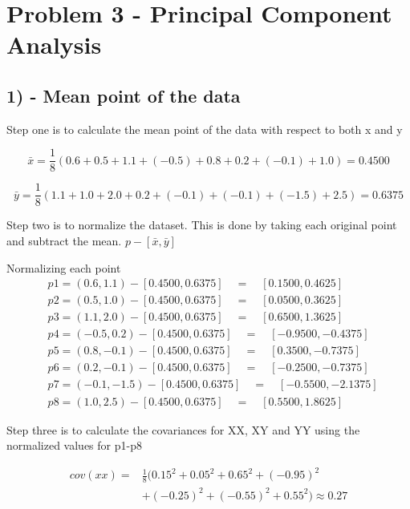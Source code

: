 \section{Problem 3 - Principal Component Analysis}
\subsection{1) - Mean point of the data}
Step one is to calculate the mean point of the data with respect to both x and y

$$\bar{x} = \frac{1}{8} (0.6 + 0.5 + 1.1 + (-0.5) + 0.8 + 0.2 + (-0.1) + 1.0) = 0.4500$$

$$\bar{y} = \frac{1}{8} (1.1 + 1.0 + 2.0 + 0.2 + (-0.1) + (-0.1) + (-1.5) + 2.5) = 0.6375$$

Step two is to normalize the dataset. This is done by taking each original point
and subtract the mean.
$p - [\bar{x}, \bar{y}]$

Normalizing each point
\begin{align}
    &p1 = (0.6 , 1.1) - [0.4500, 0.6375] \quad = \quad [0.1500, 0.4625] \\
    &p2 = (0.5 , 1.0) - [0.4500, 0.6375] \quad = \quad [0.0500, 0.3625] \\
    &p3 = (1.1 , 2.0) - [0.4500, 0.6375] \quad = \quad [0.6500, 1.3625] \\
    &p4 = (-0.5 , 0.2) - [0.4500, 0.6375] \quad = \quad [-0.9500, -0.4375] \\
    &p5 = (0.8, -0.1) - [0.4500, 0.6375] \quad = \quad [0.3500, -0.7375] \\
    &p6 = (0.2 , -0.1) - [0.4500, 0.6375] \quad = \quad [-0.2500, -0.7375] \\
    &p7 = (-0.1 , -1.5) - [0.4500, 0.6375] \quad = \quad [-0.5500, -2.1375] \\
    &p8 = (1.0, 2.5) - [0.4500, 0.6375] \quad = \quad [0.5500, 1.8625] 
\end{align}

Step three is to calculate the covariances for XX, XY and YY using the normalized values for p1-p8


\begin{equation}
    \begin{split}
        cov(xx) = & \frac{1}{8} \Big(0.15^2 + 0.05^2 + 0.65^2 + (-0.95)^2 \\
                  & + (-0.25)^2 + (-0.55)^2 + 0.55^2 \Big) \approx 0.27
    \end{split}
\end{equation}

